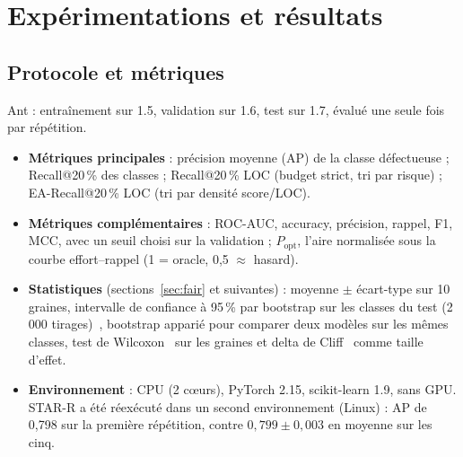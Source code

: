\documentclass[11pt,a4paper,openany]{report}
\begin{document}
\chapter{Expérimentations et résultats}

\section{Protocole et métriques}
Ant : entraînement sur 1.5, validation sur 1.6, test sur 1.7, évalué une seule fois par répétition.
\begin{itemize}
  \item \textbf{Métriques principales} : précision moyenne (AP) de la classe défectueuse ; Recall@20\,\% des classes ;
        Recall@20\,\% LOC (budget strict, tri par risque) ; EA-Recall@20\,\% LOC (tri par densité score/LOC).
  \item \textbf{Métriques complémentaires} : ROC-AUC, accuracy, précision, rappel, F1, MCC, avec un seuil choisi sur
        la validation ; $P_{\mathrm{opt}}$, l'aire normalisée sous la courbe effort--rappel (1 = oracle, 0,5 $\approx$
        hasard).
  \item \textbf{Statistiques} (sections~\ref{sec:fair} et suivantes) : moyenne $\pm$ écart-type sur 10 graines,
        intervalle de confiance à 95\,\% par bootstrap sur les classes du test (2\,000 tirages)~\cite{efron1993},
        bootstrap apparié pour comparer deux modèles sur les mêmes classes, test de Wilcoxon~\cite{wilcoxon1945} sur
        les graines et delta de Cliff~\cite{romano2006} comme taille d'effet.
  \item \textbf{Environnement} : CPU (2 cœurs), PyTorch 2.15, scikit-learn 1.9, sans GPU. STAR-R a été réexécuté dans
        un second environnement (Linux) : AP de 0,798 sur la première répétition, contre $0{,}799\pm0{,}003$ en
        moyenne sur les cinq.
\end{itemize}
\end{document}
